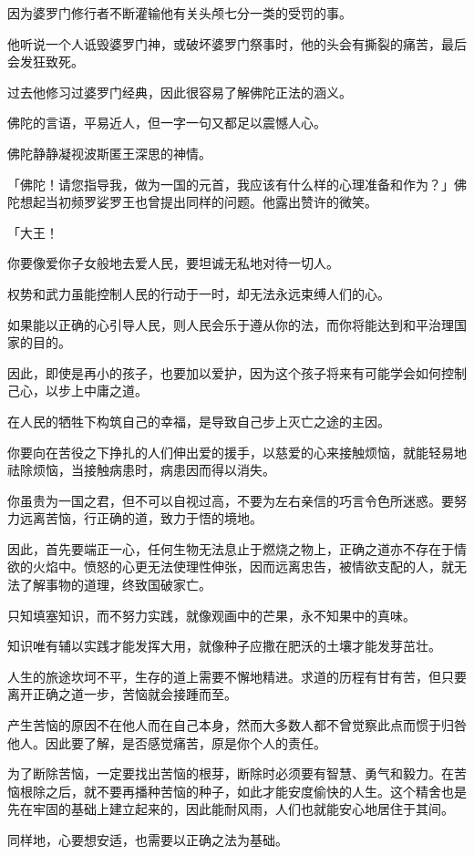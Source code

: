 \documentclass[twoside,openany]{book}
\begin{document}
因为婆罗门修行者不断灌输他有关头颅七分一类的受罚的事。

他听说一个人诋毁婆罗门神，或破坏婆罗门祭事时，他的头会有撕裂的痛苦，最后会发狂致死。

过去他修习过婆罗门经典，因此很容易了解佛陀正法的涵义。

佛陀的言语，平易近人，但一字一句又都足以震憾人心。

佛陀静静凝视波斯匿王深思的神情。

「佛陀！请您指导我，做为一国的元首，我应该有什么样的心理准备和作为？」佛陀想起当初频罗娑罗王也曾提出同样的问题。他露出赞许的微笑。

「大王！

你要像爱你子女般地去爱人民，要坦诚无私地对待一切人。

权势和武力虽能控制人民的行动于一时，却无法永远束缚人们的心。

如果能以正确的心引导人民，则人民会乐于遵从你的法，而你将能达到和平治理国家的目的。

因此，即使是再小的孩子，也要加以爱护，因为这个孩子将来有可能学会如何控制己心，以步上中庸之道。

在人民的牺牲下构筑自己的幸福，是导致自己步上灭亡之途的主因。

你要向在苦役之下挣扎的人们伸出爱的援手，以慈爱的心来接触烦恼，就能轻易地祛除烦恼，当接触病患时，病患因而得以消失。

你虽贵为一国之君，但不可以自视过高，不要为左右亲信的巧言令色所迷惑。要努力远离苦恼，行正确的道，致力于悟的境地。

因此，首先要端正一心，任何生物无法息止于燃烧之物上，正确之道亦不存在于情欲的火焰中。愤怒的心更无法使理性伸张，因而远离忠告，被情欲支配的人，就无法了解事物的道理，终致国破家亡。

只知填塞知识，而不努力实践，就像观画中的芒果，永不知果中的真味。

知识唯有辅以实践才能发挥大用，就像种子应撒在肥沃的土壤才能发芽茁壮。

人生的旅途坎坷不平，生存的道上需要不懈地精进。求道的历程有甘有苦，但只要离开正确之道一步，苦恼就会接踵而至。

产生苦恼的原因不在他人而在自己本身，然而大多数人都不曾觉察此点而惯于归咎他人。因此要了解，是否感觉痛苦，原是你个人的责任。

为了断除苦恼，一定要找出苦恼的根芽，断除时必须要有智慧、勇气和毅力。在苦恼根除之后，就不要再播种苦恼的种子，如此才能安度偷快的人生。这个精舍也是先在牢固的基础上建立起来的，因此能耐风雨，人们也就能安心地居住于其间。

同样地，心要想安适，也需要以正确之法为基础。
\end{document}
